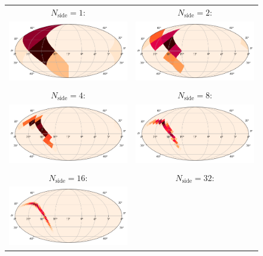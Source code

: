 \begin{colsection}
\begin{figure}[p]
    \begin{center}
        \begin{tabular}{cc}
            $N_\text{side} = 1$: &
            $N_\text{side} = 2$: \\
            \includegraphics[width=0.45\linewidth]{images/regrade/1.png} &
            \includegraphics[width=0.45\linewidth]{images/regrade/2.png} \\
            \\
            $N_\text{side} = 4$: &
            $N_\text{side} = 8$: \\
            \includegraphics[width=0.45\linewidth]{images/regrade/4.png} &
            \includegraphics[width=0.45\linewidth]{images/regrade/8.png} \\
            \\
            $N_\text{side} = 16$: &
            $N_\text{side} = 32$: \\
            \includegraphics[width=0.45\linewidth]{images/regrade/16.png} &

\end{tabular}
\end{center}
\end{figure}
\end{colsection}
